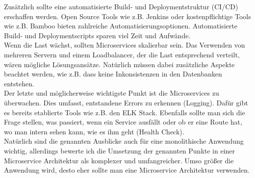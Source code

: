 Zusätzlich sollte eine automatisierte Build- und Deploymentstruktur (CI/CD) erschaffen werden. Open Source Tools wie z.B. Jenkins oder kostenpflichtige Tools wie z.B. Bamboo bieten zahlreiche Automatisierungsoptionen. Automatisierte Build- und Deploymentscripts sparen viel Zeit und Aufwände. \\

Wenn die Last wächst, sollten Microservices skalierbar sein. Das Verwenden von mehreren Servern und einem Loadbalancer, der die Last entsprechend verteilt, wären mögliche Lösungsansätze. Natürlich müssen dabei zusätzliche Aspekte beachtet werden, wie z.B. dass keine Inkonsistenzen in den Datenbanken entstehen. \\

Der letzte und möglicherweise wichtigste Punkt ist die Microservices zu überwachen. Dies umfasst, entstandene Errors zu erkennen (Logging). Dafür gibt es bereits etablierte Tools wie z.B. den ELK Stack. Ebenfalls sollte man sich die Frage stellen, was passiert, wenn ein Service ausfällt oder ob er eine Route hat, wo man intern sehen kann, wie es ihm geht (Health Check). \\
 
Natürlich sind die genannten Ausblicke auch für eine monolithische Anwendung wichtig, allerdings bewerte ich die Umsetzung der genannten Punkte in einer Microservice Architektur als komplexer und umfangreicher. Umso größer die Anwendung wird, desto eher sollte man eine Microservice Architektur verwenden.